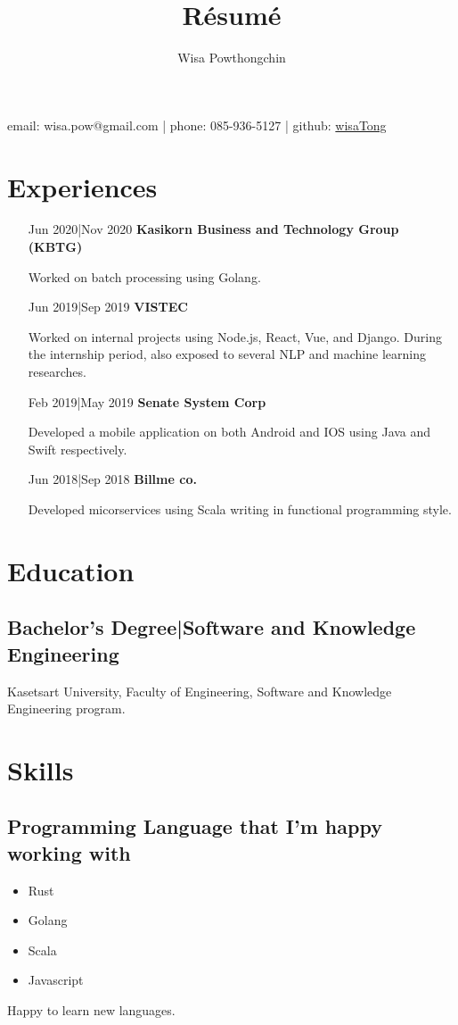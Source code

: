 \documentclass[a4paper]{article}
\makeatletter
\renewcommand{\maketitle}{
  \begin{center}
  {\huge\bfseries\theauthor}

  \vspace{1em}
    email: wisa.pow@gmail.com | phone: 085-936-5127 | github: \href{https://github.com/wisaTong}{wisaTong}
  \end{center}
}
\makeatother
\begin{document}
\title{R\'esum\'e}
\author{Wisa Powthongchin}

\maketitle

\section{Experiences}
\begin{itemize}[font=\itshape, leftmargin=4cm, itemsep=.75em, labelsep=2em]
  \item[Jun 2020|Nov 2020]\textbf{\large Kasikorn Business and Technology Group (KBTG)}

    Worked on batch processing using Golang.
  \item[Jun 2019|Sep 2019]\textbf{\large VISTEC}

    Worked on internal projects using Node.js, React, Vue, and Django. During
    the internship period, also exposed to several NLP and machine learning
    researches. 
  \item[Feb 2019|May 2019]\textbf{\large Senate System Corp}

    Developed a mobile application on both Android and IOS using Java and Swift
    respectively. 
  \item[Jun 2018|Sep 2018]\textbf{\large Billme co.}

     Developed micorservices using Scala writing in functional programming
     style. 
\end{itemize}

\section{Education}
\subsection{Bachelor's Degree|Software and Knowledge Engineering}
Kasetsart University, Faculty of Engineering, Software and Knowledge Engineering program.

\section{Skills}
\subsection{Programming Language that I'm happy working with}
\begin{multicols}{2}
  \begin{itemize}
    \item Rust
    \item Golang
    \item Scala
    \item Javascript
  \end{itemize}
\end{multicols}
Happy to learn new languages.
\end{document}
